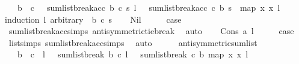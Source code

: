 \begin{isabellebody}
\ \ \ {\isachardoublequoteopen}b\ {\isasymnoteq}\ c\ \ {\isasymLongrightarrow}\ sumlist{\isacharunderscore}{\kern0pt}break{\isacharunderscore}{\kern0pt}acc\ b\ c\ s\ l{}\ {\isacharequal}{\kern0pt}\ {\isacharminus}{\kern0pt}\ sumlist{\isacharunderscore}{\kern0pt}break{\isacharunderscore}{\kern0pt}acc\ c\ b\ {\isacharparenleft}{\kern0pt}{\isacharminus}{\kern0pt}s{\isacharparenright}{\kern0pt}\ {\isacharparenleft}{\kern0pt}\ map\ {\isacharparenleft}{\kern0pt}{\isasymlambda}x{\isachardot}{\kern0pt}\ {\isacharminus}{\kern0pt}x{\isacharparenright}{\kern0pt}\ l{}{\isacharparenright}{\kern0pt}{\isachardoublequoteclose}\isanewline
%
\isadelimproof
%
\endisadelimproof
%
\isatagproof
{}\isamarkupfalse%
{\isacharparenleft}{\kern0pt}induction\ l{}\ arbitrary{\isacharcolon}{\kern0pt}\ \ b\ c\ s{\isacharparenright}{\kern0pt}\isanewline
\ \ \isamarkupfalse%
\ Nil\isanewline
\ \ \isamarkupfalse%
\ \isamarkupfalse%
\ {\isacharquery}{\kern0pt}case\ \isamarkupfalse%
\ sumlist{\isacharunderscore}{\kern0pt}break{\isacharunderscore}{\kern0pt}acc{\isachardot}{\kern0pt}simps{\isacharparenleft}{\kern0pt}{}{\isacharparenright}{\kern0pt}\ antisymmetric{\isacharunderscore}{\kern0pt}tie{\isacharunderscore}{\kern0pt}break\ \isamarkupfalse%
\ auto\isanewline
{}\isamarkupfalse%
\isanewline
\ \ \isamarkupfalse%
\ {\isacharparenleft}{\kern0pt}Cons\ a\ l{\isacharparenright}{\kern0pt}\isanewline
\ \ \isamarkupfalse%
\ \isamarkupfalse%
\ {\isacharquery}{\kern0pt}case\ \isamarkupfalse%
\ list{\isachardot}{\kern0pt}simps{\isacharparenleft}{\kern0pt}{}{\isacharparenright}{\kern0pt}\ sumlist{\isacharunderscore}{\kern0pt}break{\isacharunderscore}{\kern0pt}acc{\isachardot}{\kern0pt}simps{\isacharparenleft}{\kern0pt}{}{\isacharparenright}{\kern0pt}\ \isamarkupfalse%
\ auto\ \ \isanewline
{}\isamarkupfalse%
%
\endisatagproof
{\isafoldproof}%
%
\isadelimproof
\isanewline
%
\endisadelimproof
\ \ \isanewline
\isanewline
{}\isamarkupfalse%
\ antisymmetric{\isacharunderscore}{\kern0pt}sumlist{\isacharcolon}{\kern0pt}\isanewline
\ \ \ {\isachardoublequoteopen}b\ {\isasymnoteq}\ c\ {\isasymand}\ l\ {\isasymnoteq}{\isacharbrackleft}{\kern0pt}{\isacharbrackright}{\kern0pt}\ {\isasymLongrightarrow}\ sumlist{\isacharunderscore}{\kern0pt}break\ b\ c\ l\ {\isacharequal}{\kern0pt}\ {\isacharminus}{\kern0pt}\ sumlist{\isacharunderscore}{\kern0pt}break\ c\ b\ {\isacharparenleft}{\kern0pt}map\ {\isacharparenleft}{\kern0pt}{\isasymlambda}x{\isachardot}{\kern0pt}\ {\isacharminus}{\kern0pt}x{\isacharparenright}{\kern0pt}\ l{\isacharparenright}{\kern0pt}\ {\isachardoublequoteclose}\isanewline

\end{isabellebody}
